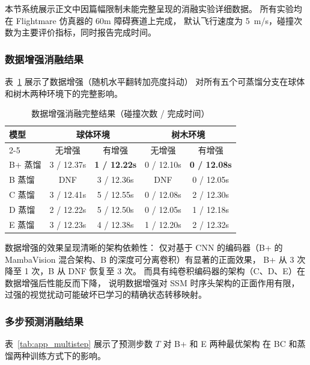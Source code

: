 \documentclass[12pt,a4paper]{article}
\numberwithin{equation}{section}
\numberwithin{figure}{section}
\numberwithin{table}{section}
\begin{document}
本节系统展示正文中因篇幅限制未能完整呈现的消融实验详细数据。
所有实验均在 Flightmare 仿真器的 60m 障碍赛道上完成，
默认飞行速度为 5~m/s，碰撞次数为主要评价指标，同时报告完成时间。

\subsubsection{数据增强消融结果}

表~\ref{tab:app_aug} 展示了数据增强（随机水平翻转加亮度抖动）
对所有五个可蒸馏分支在球体和树木两种环境下的完整影响。

\begin{table}[H]
\centering
\caption{数据增强消融完整结果（碰撞次数 / 完成时间）}
\label{tab:app_aug}
\begin{tabular}{lcccc}
\toprule
\multirow{2}{*}{\textbf{模型}} & \multicolumn{2}{c}{\textbf{球体环境}} & \multicolumn{2}{c}{\textbf{树木环境}} \\
\cline{2-5}
 & 无增强 & 有增强 & 无增强 & 有增强 \\
\midrule
B+ 蒸馏 & 3 / 12.37s & \textbf{1 / 12.22s} & 0 / 12.10s & \textbf{0 / 12.08s} \\
B 蒸馏 & DNF & 3 / 12.36s & DNF & 0 / 12.05s \\
C 蒸馏 & 3 / 12.41s & 5 / 12.55s & 0 / 12.08s & 2 / 12.30s \\
D 蒸馏 & 2 / 12.22s & 5 / 12.50s & 0 / 12.05s & 1 / 12.18s \\
E 蒸馏 & 3 / 12.23s & 4 / 12.38s & 1 / 12.20s & 2 / 12.32s \\
\bottomrule
\end{tabular}
\end{table}

\noindent 数据增强的效果呈现清晰的架构依赖性：
仅对基于 CNN 的编码器（B+ 的 MambaVision 混合架构、B 的深度可分离卷积）有显著的正面效果，
B+ 从 3 次降至 1 次，B 从 DNF 恢复至 3 次。
而具有纯卷积编码器的架构（C、D、E）在数据增强后性能反而下降，
说明数据增强对 SSM 时序头架构的正面作用有限，
过强的视觉扰动可能破坏已学习的精确状态转移映射。

\subsubsection{多步预测消融结果}

表~\ref{tab:app_multistep} 展示了预测步数 $T$ 对 B+ 和 E 两种最优架构
在 BC 和蒸馏两种训练方式下的影响。
\end{document}
